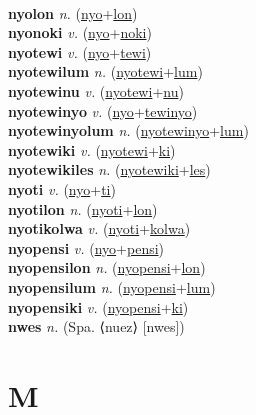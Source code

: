  \label{nyoaw} \\
\textbf{nyolon} \textit{n.} (\hyperref[nyo]{nyo}+\hyperref[lon]{lon})
 \label{nyolon} \\
\textbf{nyonoki} \textit{v.} (\hyperref[nyo]{nyo}+\hyperref[noki]{noki})
 \label{nyonoki} \\
\textbf{nyotewi} \textit{v.} (\hyperref[nyo]{nyo}+\hyperref[tewi]{tewi})
 \label{nyotewi} \\
\textbf{nyotewilum} \textit{n.} (\hyperref[nyotewi]{nyotewi}+\hyperref[lum]{lum})
 \label{nyotewilum} \\
\textbf{nyotewinu} \textit{v.} (\hyperref[nyotewi]{nyotewi}+\hyperref[nu]{nu})
 \label{nyotewinu} \\
\textbf{nyotewinyo} \textit{v.} (\hyperref[nyo]{nyo}+\hyperref[tewinyo]{tewinyo})
 \label{nyotewinyo} \\
\textbf{nyotewinyolum} \textit{n.} (\hyperref[nyotewinyo]{nyotewinyo}+\hyperref[lum]{lum})
 \label{nyotewinyolum} \\
\textbf{nyotewiki} \textit{v.} (\hyperref[nyotewi]{nyotewi}+\hyperref[ki]{ki})
 \label{nyotewiki} \\
\textbf{nyotewikiles} \textit{n.} (\hyperref[nyotewiki]{nyotewiki}+\hyperref[les]{les})
 \label{nyotewikiles} \\
\textbf{nyoti} \textit{v.} (\hyperref[nyo]{nyo}+\hyperref[ti]{ti})
 \label{nyoti} \\
\textbf{nyotilon} \textit{n.} (\hyperref[nyoti]{nyoti}+\hyperref[lon]{lon})
 \label{nyotilon} \\
\textbf{nyotikolwa} \textit{v.} (\hyperref[nyoti]{nyoti}+\hyperref[kolwa]{kolwa})
 \label{nyotikolwa} \\
\textbf{nyopensi} \textit{v.} (\hyperref[nyo]{nyo}+\hyperref[pensi]{pensi})
 \label{nyopensi} \\
\textbf{nyopensilon} \textit{n.} (\hyperref[nyopensi]{nyopensi}+\hyperref[lon]{lon})
 \label{nyopensilon} \\
\textbf{nyopensilum} \textit{n.} (\hyperref[nyopensi]{nyopensi}+\hyperref[lum]{lum})
 \label{nyopensilum} \\
\textbf{nyopensiki} \textit{v.} (\hyperref[nyopensi]{nyopensi}+\hyperref[ki]{ki})
 \label{nyopensiki} \\
\textbf{nwes} \textit{n.} (Spa. ⟨nuez⟩ [nwes])
 \label{nwes} 

\section{M}

